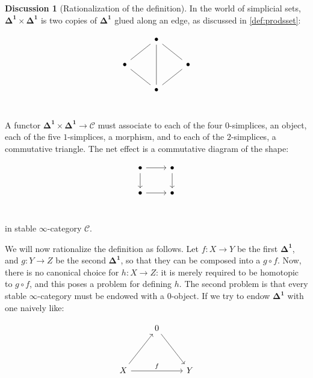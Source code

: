 \documentclass[10pt]{amsart}
\newcommand{\8}{\ensuremath{\infty}}
\newcommand{\0}{\ensuremath{\overset{\rightarrow}{0}}}
\newcommand{\1}{\ensuremath{\mathbf{1}}}
\newcommand{\C}{\ensuremath{\mathscr{C}}}
\newcommand{\Simplex}[1]{\ensuremath{\boldsymbol{\Delta^{#1}}}}
\theoremstyle{definition}
\newtheorem{discussion}[definition]{Discussion}
\numberwithin{definition}{subsection}
\numberwithin{definition}{section}
\begin{document}
\begin{discussion}[Rationalization of the definition]
  In the world of simplicial sets, $\Simplex{1} \times \Simplex{1}$ is two copies of $\Simplex{1}$ glued along an edge, as discussed in \ref{def:prodsset}:

  \begin{equation*}
    \begin{tikzcd}
      & \bullet \arrow[dr, dash] \arrow[dd, dash] & \\
      \bullet \arrow[ur, dash] \arrow[dr, dash] & & \bullet \\
      & \bullet \arrow[ur, dash] & \\
    \end{tikzcd}
  \end{equation*}

  A functor $\Simplex{1} \times \Simplex{1} \rightarrow \C$ must associate to each of the four $0$-simplices, an object, each of the five $1$-simplices, a morphism, and to each of the $2$-simplices, a commutative triangle. The net effect is a commutative diagram of the shape:

  \begin{equation*}
    \begin{tikzcd}
      \bullet \arrow[r] \arrow[d] & \bullet \arrow[d] \\
      \bullet \arrow[r] & \bullet \\
    \end{tikzcd}
  \end{equation*}

  in stable \8-category \C.

  We will now rationalize the definition as follows. Let $f: X \rightarrow Y$ be the first \Simplex{1}, and $g: Y \rightarrow Z$ be the second \Simplex{1}, so that they can be composed into a $g \circ f$. Now, there is no canonical choice for $h: X \rightarrow Z$: it is merely required to be homotopic to $g \circ f$, and this poses a problem for defining $h$. The second problem is that every stable \8-category must be endowed with a $0$-object. If we try to endow $\Simplex{1}$ with one naively like:

  \begin{equation*}
    \begin{tikzcd}
      & 0 \arrow[ddr] & \\
      \\
      X \arrow[uur] \arrow[rr, "f"] & & Y \\
    \end{tikzcd}
  \end{equation*}


\end{discussion}
\end{document}
